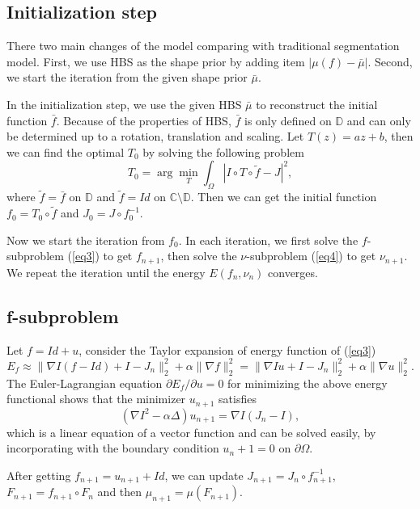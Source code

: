 \documentclass{article}
\begin{document}
\subsection{Initialization step}
There two main changes of the model comparing with traditional segmentation model. First, we use HBS as the shape prior by adding item $|\mu(f) - \bar{\mu} |$. Second, we start the iteration from the given shape prior $\bar{\mu}$.

In the initialization step, we use the given HBS $\bar{\mu}$ to reconstruct the initial function $\bar{f}$. Because of the properties of HBS, $\bar{f}$ is only defined on $\mathbb{D}$ and can only be determined up to a rotation, translation and scaling. Let $T(z) = az +b $, then we can find the optimal $T_0$ by solving the following problem 
\begin{equation}\label{eq5}
    T_0 = \arg\min_T \int_\Omega | I \circ T \circ \tilde{f}  - J |^2,
\end{equation}
where $\tilde{f} = \bar{f}$ on $\mathbb{D}$ and $\tilde{f} = Id$ on $\mathbb{C} \setminus \mathbb{D}$. Then we can get the initial function $f_0 = T_0 \circ \tilde{f}$ and $J_0 = J \circ f_0^{-1}$.

Now we start the iteration from $f_0$. In each iteration, we first solve the $f$-subproblem (\ref{eq3}) to get $f_{n+1}$, then solve the $\nu$-subproblem (\ref{eq4}) to get $\nu_{n+1}$. We repeat the iteration until the energy $E(f_n, \nu_n)$ converges.

\subsection{f-subproblem}
Let $f = Id + u$, consider the Taylor expansion of energy function of (\ref{eq3})
\begin{equation}
    E_f \approx \| \nabla I (f - Id ) + I - J_n \|^2_2 + \alpha \| \nabla f \|^2_2 = \| \nabla I u + I - J_n \|^2_2 + \alpha \| \nabla u \|^2_2.
\end{equation}
The Euler-Lagrangian equation $\partial E_f / \partial u = 0$ for minimizing the above energy functional shows that the minimizer $u_{n+1}$ satisfies
\begin{equation}
    ( \nabla I ^2 - \alpha \Delta) u_{n+1} = \nabla I (J_n - I),
\end{equation}
which is a linear equation of a vector function and can be solved easily, by incorporating with the boundary condition $u_n+1 =0 $ on $\partial \Omega$.

After getting $f_{n+1} = u_{n+1} + Id$, we can update $J_{n+1} = J_n \circ f_{n+1}^{-1}$, $F_{n+1} = f_{n+1} \circ F_n$ and then $\mu_{n+1} = \mu(F_{n+1})$.
\end{document}
